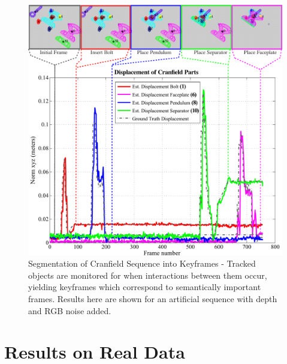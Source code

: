 \begin{figure}[!ht]
  \centering
  \includegraphics[width=\linewidth]{figures/Tracking/Action_Segmentation.pdf}
  \caption[Segmentation of Actions]{Segmentation of Cranfield Sequence into Keyframes - Tracked objects are monitored for when interactions between them occur, yielding keyframes which correspond to semantically important frames. Results here are shown for an artificial sequence with depth and RGB noise added.}
  \label{fig:ActionSegmentation}
\end{figure}

\section{Results on Real Data}



